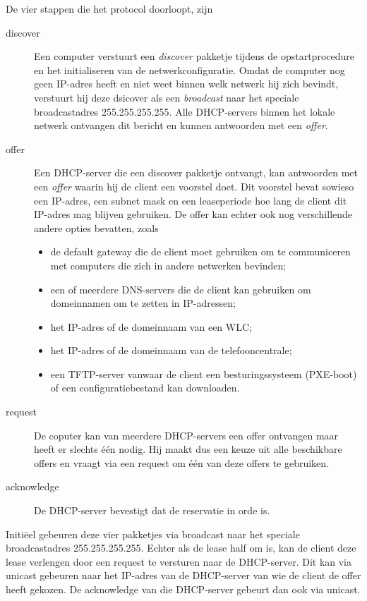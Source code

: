 De vier stappen die het protocol doorloopt, zijn
\begin{description}
\item[discover]
   Een computer verstuurt een \emph{discover} pakketje tijdens de opstartprocedure en het initialiseren van de netwerkconfiguratie.
   Omdat de computer nog geen IP-adres heeft en niet weet binnen welk netwerk hij zich bevindt, verstuurt hij deze dsicover als een \emph{broadcast} naar het speciale broadcastadres 255.255.255.255.
   Alle DHCP-servers binnen het lokale netwerk ontvangen dit bericht en kunnen antwoorden met een \emph{offer}.
\item[offer]
   Een DHCP-server die een discover pakketje ontvangt, kan antwoorden met een \emph{offer} waarin hij de client een voorstel doet.
   Dit voorstel bevat sowieso een IP-adres, een subnet mask en een leaseperiode hoe lang de client dit IP-adres mag blijven gebruiken.
   De offer kan echter ook nog verschillende andere opties bevatten, zoals
   \begin{itemize}
   \item de default gateway die de client moet gebruiken om te communiceren met computers die zich in andere netwerken bevinden;
   \item een of meerdere DNS-servers die de client kan gebruiken om domeinnamen om te zetten in IP-adressen;
   \item het IP-adres of de domeinnaam van een WLC;
   \item het IP-adres of de domeinnaam van de telefooncentrale;
   \item een TFTP-server vanwaar de client een besturingssysteem (PXE-boot) of een configuratiebestand kan downloaden.
   \end{itemize}
\item[request]
   De coputer kan van meerdere DHCP-servers een offer ontvangen maar heeft er slechts één nodig.
   Hij maakt dus een keuze uit alle beschikbare offers en vraagt via een request om één van deze offers te gebruiken.
\item[acknowledge]
   De DHCP-server bevestigt dat de reservatie in orde is.
\end{description}
Initiëel gebeuren deze vier pakketjes via broadcast naar het speciale broadcastadres 255.255.255.255.
Echter als de lease half om is, kan de client deze lease verlengen door een request te versturen naar de DHCP-server.
Dit kan via unicast gebeuren naar het IP-adres van de DHCP-server van wie de client de offer heeft gekozen.
De acknowledge van die DHCP-server gebeurt dan ook via unicast.

